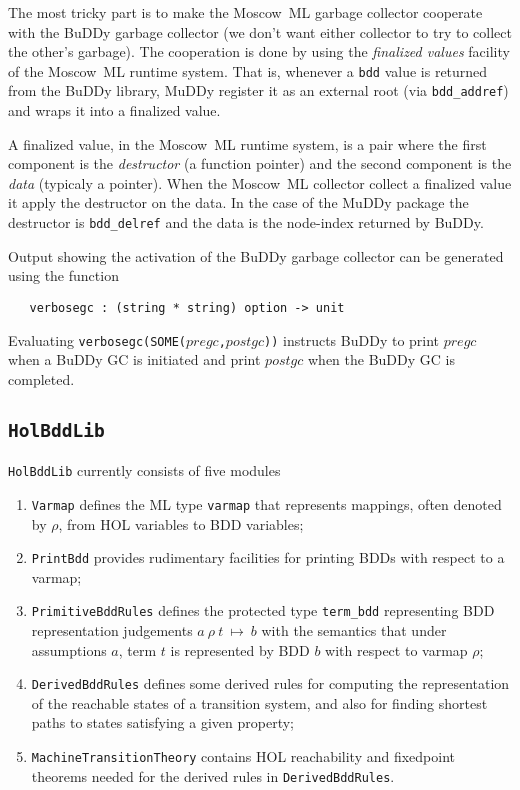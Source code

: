 \documentclass[12pt]{book}
\renewcommand{\t}[1]{\mbox{\tt #1}}
\newcommand{\termbdd}[4]{\mbox{$#1~#2~#3~\mapsto~#4$}}
\newcommand\termbddty{\texttt{term\_bdd}{}}
\newcommand{\mosml}{Moscow~ML{}}
\newcommand{\Buddy}{BuDDy{}}
\newcommand{\Muddy}{MuDDy{}}
\begin{document}
The most tricky part is to make the \mosml{} garbage collector cooperate
with the \Buddy{} garbage collector (we don't want either collector to
try to collect the other's garbage).  The cooperation is done by using
the \emph{finalized values} facility of the \mosml{} runtime system.
That is, whenever a \texttt{bdd} value is returned from the \Buddy{}
library, \Muddy{} register it as an external root (via
\verb+bdd_addref+) and wraps it into a finalized value.  

A finalized value, in the \mosml{} runtime system, is a pair where the
first component is the \emph{destructor} (a function pointer) and the
second component is the \emph{data} (typicaly a pointer).  When the
\mosml{} collector collect a finalized value it apply the destructor on
the data.  In the case of the \Muddy{} package the destructor is
\verb+bdd_delref+ and the data is the node-index returned by \Buddy{}.

Output showing the activation of the \Buddy{} garbage collector can be generated
using the function

\begin{verbatim}
   verbosegc : (string * string) option -> unit
\end{verbatim}

Evaluating \t{verbosegc(SOME($pregc$,$postgc$))} instructs BuDDy to print
$pregc$ when a BuDDy GC is initiated and print $postgc$ when the
\Buddy{} GC is completed.

\subsection{\t{HolBddLib}}\label{HolBddLib}

\t{HolBddLib} currently consists of five modules

\begin{enumerate}
\item \t{Varmap} defines the ML type \t{varmap} that represents mappings,
often denoted by $\rho$,
from HOL variables to BDD variables;

\item \t{PrintBdd} provides rudimentary facilities for printing
BDDs with respect to a varmap;

\item \t{PrimitiveBddRules} defines the protected type \termbddty
representing BDD representation judgements \termbdd{a}{\rho}{t}{b}
with the semantics that under assumptions $a$, term $t$ is represented by BDD $b$ with respect to
varmap $\rho$;

\item \t{DerivedBddRules} defines some derived rules for computing
the representation of the reachable states of a transition system,
and also for finding shortest paths to states  satisfying a given property;

\item \t{MachineTransitionTheory} contains HOL reachability and fixedpoint theorems needed
for the derived rules in  \t{DerivedBddRules}.


\end{enumerate}
\end{document}

